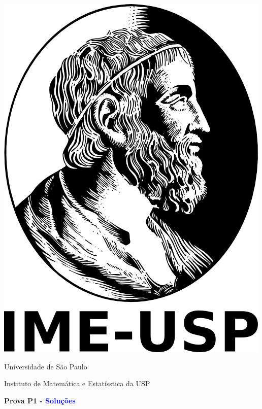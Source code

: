 \documentclass[oneside,a4paper,12pt]{article}
\theoremstyle{Colorido}
\theoremstyle{solu}
\theoremstyle{dotlessP}
\newcommand{\universidade}{Universidade de São Paulo}
\newcommand{\centro}{Instituto de Matemática e Estatísstica da USP}
\newcommand{\professor}{Douglas de Araujo Smigly}
\newcommand{\disciplina}{MAT0120 - Álgebra I para Licenciatura}
\begin{document}
	\pagestyle{empty}
	
	\begin{center}
	\includegraphics[width=\linewidth/8]{logoIME.png}%
	 	\vspace{0pt}
	 	
		\universidade
		\par
		\centro
		\par
		\par
		\par
		\vspace{24pt}
		\LARGE \textbf{Prova P1 - \textcolor{blue}{Solu\c c\~oes}}
		
	\end{center}
	
	\vspace{24pt}
	
%		
%	
	
\end{document}
